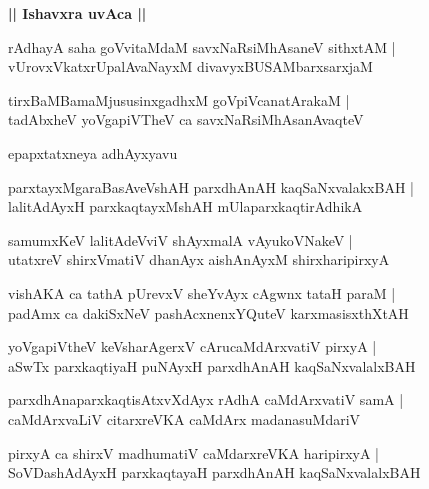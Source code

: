 \documentclass[twoside,12pt,openright]{book}
\newcounter{shloka}[chapter]
\def\uvaca#1{\centerline{{\large\textbf{#1}}}}
\begin{document}
\uvaca{|| Ishavxra uvAca ||}

\begin{shloka}%
rAdhayA saha goVvitaMdaM savxNaRsiMhAsaneV sithxtAM |\\
vUrovxVkatxrUpalAvaNayxM divavyxBUSAMbarxsarxjaM 
\end{shloka}

\begin{shloka}%
tirxBaMBamaMjususinxgadhxM goVpiVcanatArakaM |\\
tadAbxheV yoVgapiVTheV ca savxNaRsiMhAsanAvaqteV 
\end{shloka}

\begin{center}
epapxtatxneya adhAyxyavu
\end{center}

\begin{shloka}%
parxtayxMgaraBasAveVshAH parxdhAnAH kaqSaNxvalakxBAH |\\
lalitAdAyxH parxkaqtayxMshAH mUlaparxkaqtirAdhikA 
\end{shloka}

\begin{shloka}%
samumxKeV lalitAdeVviV shAyxmalA vAyukoVNakeV |\\
utatxreV shirxVmatiV dhanAyx aishAnAyxM shirxharipirxyA 
\end{shloka}

\begin{shloka}%
vishAKA ca tathA pUrevxV sheYvAyx cAgwnx tataH paraM |\\
padAmx ca dakiSxNeV pashAcxnenxYQuteV karxmasisxthXtAH 
\end{shloka}

\begin{shloka}%
yoVgapiVtheV keVsharAgerxV cArucaMdArxvatiV pirxyA |\\
aSwTx parxkaqtiyaH puNAyxH parxdhAnAH kaqSaNxvalalxBAH 
\end{shloka}

\begin{shloka}%
parxdhAnaparxkaqtisAtxvXdAyx rAdhA caMdArxvatiV samA |\\
caMdArxvaLiV citarxreVKA caMdArx madanasuMdariV 
\end{shloka}

\begin{shloka}%
pirxyA ca shirxV madhumatiV caMdarxreVKA haripirxyA |\\
SoVDashAdAyxH parxkaqtayaH parxdhAnAH kaqSaNxvalalxBAH 
\end{shloka}
\end{document}
